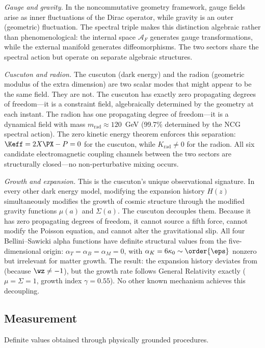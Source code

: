 \textit{Gauge and gravity.} In the noncommutative geometry framework,
gauge fields arise as inner fluctuations of the Dirac operator, while
gravity is an outer (geometric) fluctuation. The spectral triple makes
this distinction algebraic rather than phenomenological: the internal
space $\mathcal{A}_F$ generates gauge transformations, while the
external manifold generates diffeomorphisms. The two sectors share the
spectral action but operate on separate algebraic structures.

\textit{Cuscuton and radion.} The cuscuton (dark energy) and the radion
(geometric modulus of the extra dimension) are two scalar modes that
might appear to be the same field. They are not. The cuscuton has
exactly zero propagating degrees of freedom---it is a constraint field,
algebraically determined by the geometry at each instant. The radion
has one propagating degree of freedom---it is a dynamical field with
mass $m_{\mathrm{rad}} \approx 120$~GeV (99.7\% determined by the NCG
spectral action). The zero kinetic energy theorem enforces this
separation: $\Keff = 2X\PX - P = 0$ for the cuscuton, while
$K_{\mathrm{rad}} \neq 0$ for the radion. All six candidate
electromagnetic coupling channels between the two sectors are
structurally closed---no non-perturbative mixing occurs.

\textit{Growth and expansion.} This is the cuscuton's unique
observational signature. In every other dark energy model, modifying
the expansion history $H(z)$ simultaneously modifies the growth of
cosmic structure through the modified gravity functions $\mu(a)$ and
$\Sigma(a)$. The cuscuton decouples them. Because it has zero
propagating degrees of freedom, it cannot source a fifth force, cannot
modify the Poisson equation, and cannot alter the gravitational slip.
All four Bellini--Sawicki alpha functions have definite structural
values from the five-dimensional origin:
$\alpha_T = \alpha_B = \alpha_M = 0$, with
$\alpha_K = 6\kappa_0 \sim \order{\eps}$ nonzero but irrelevant for
matter growth. The result: the expansion history deviates from
\LCDM{} (because $\wz \neq -1$), but the growth rate follows General
Relativity exactly ($\mu = \Sigma = 1$, growth index $\gamma = 0.55$).
No other known mechanism achieves this decoupling.

\subsection{Measurement}
\label{sec:0-measurement}

Definite values obtained through physically grounded procedures.

